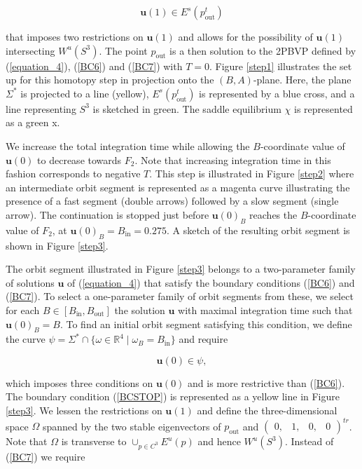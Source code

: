 \documentclass{ws-ijbc}
\begin{document}
\begin{equation}
\mathbf{u}(1) \in E^s(p^t_{\text{out}})
\label{BC7}
\end{equation}
    
\noindent
that imposes two restrictions on $\mathbf{u}(1)$ and allows for the possibility of $\mathbf{u}(1)$ intersecting $W^u(S^3)$.  The point $p_{\text{out}}$ is a then solution to the 2PBVP defined by (\ref{equation_4}), (\ref{BC6}) and (\ref{BC7}) with $T=0$.  Figure \ref{step1} illustrates the set up for this homotopy step in projection onto the $(B,A)$-plane.  Here, the plane $\Sigma^*$ is projected to a line (yellow), $E^s(p^t_{\mathrm{out}})$ is represented by a blue cross, and a line representing $S^3$ is sketched in green.  The saddle equilibrium $\chi$ is represented as a green x.
    
We increase the total integration time while allowing the $B$-coordinate value of $\mathbf{u}(0)$ to decrease towards $F_2$.  Note that increasing integration time in this fashion corresponds to negative $T$.  This step is illustrated in Figure \ref{step2} where an intermediate orbit segment is represented as a magenta curve illustrating the presence of a fast segment (double arrows) followed by a slow segment (single arrow).  The continuation is stopped just before $\mathbf{u}(0)_B$ reaches the $B$-coordinate value of $F_2$, at $\mathbf{u}(0)_B = B_{\text{in}}=0.275$.  A sketch of the resulting orbit segment is shown in Figure \ref{step3}.
    
The orbit segment illustrated in Figure \ref{step3} belongs to a two-parameter family of solutions $\mathbf{u}$ of (\ref{equation_4}) that satisfy the boundary conditions (\ref{BC6}) and (\ref{BC7}).  To select a one-parameter family of orbit segments from these, we select for each $B \in [B_{\text{in}}, B_{\text{out}}]$ the solution $\mathbf{u}$ with maximal integration time such that $\mathbf{u}(0)_B=B$.  To find an initial orbit segment satisfying this condition, we define the curve $\psi = \Sigma^*\cap \{ \omega \in \mathbb{R}^4 \; | \; \omega_B = B_{\text{in}}\}$ and require
    
    
\begin{equation}
\mathbf{u}(0) \in \psi,
\label{BCSTOP}
\end{equation}
    
\noindent
which imposes three conditions on $\mathbf{u}(0)$ and is more restrictive than (\ref{BC6}).  The boundary condition (\ref{BCSTOP}) is represented as a yellow line in Figure \ref{step3}.  We lessen the restrictions on $\mathbf{u}(1)$ and define the three-dimensional space $\Omega$ spanned by the two stable eigenvectors of $p_{\text{out}}$ and $\begin{pmatrix} 0, & 1, & 0, & 0 \end{pmatrix}^{tr}$.  Note that $\Omega$ is transverse to $\cup_{p \in C^3}E^u(p)$ and hence $W^u(S^3)$.  Instead of (\ref{BC7}) we require
    
\end{document}
